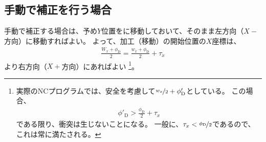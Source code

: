 \clearpage
\subsection{手動で補正を行う場合}
手動で補正する場合は、予め$Y$位置をに移動しておいて、そのまま左方向（$X-$方向）に移動すればよい。
よって、加工（移動）の開始位置の$X$座標は、
\begin{align*}
  \frac{W_x+\phi_\mathrm D}2 = \frac{w_x+\phi_\mathrm D}2+\tau_x
\end{align*}
より右方向（$X+$方向）にあればよい
\footnote{実際のNCプログラムでは、安全を考慮して$\nicefrac{w_x}2+\phi'_\mathrm D$としている。
この場合、
\begin{align*}
  \phi'_\mathrm D > \frac{\phi_\mathrm D}2+\tau_x
\end{align*}
である限り、衝突は生じないことになる。
一般に、$\tau_x < \nicefrac{\phi_\mathrm D}2$であるので、これは常に満たされる。}。
